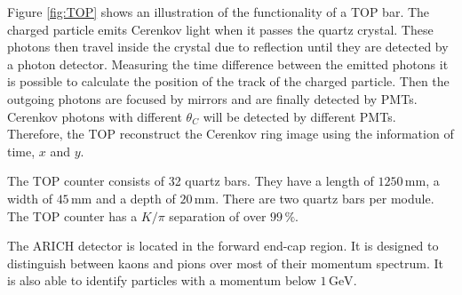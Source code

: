 \documentclass[a4paper,11pt,twosided,final,german,openbib,pdftex,listof=totoc,bibliography=totoc]{scrbook}
\begin{document}
Figure \ref{fig:TOP} shows an illustration of the functionality of a TOP bar. The charged particle emits Cerenkov light when it passes the quartz crystal. These photons then travel inside the crystal due to reflection until they are detected by a photon detector. Measuring the time difference between the emitted photons it is possible to calculate the position of the track of the charged particle. Then the outgoing photons are focused by mirrors and are finally detected by PMTs. Cerenkov photons with different $\theta_C$ will be detected by different PMTs. Therefore, the TOP reconstruct the Cerenkov ring image using the information of time, $x$ and $y$.\cite{B2TR} 

The TOP counter consists of 32 quartz bars. They have a length of $1250\,\textrm{mm}$, a width of $45\,\textrm{mm}$ and a depth of $20\,\textrm{mm}$. There are two quartz bars per module. The TOP counter has a $K/\pi$ separation of over $99\,\%$.\cite{B2TR}

The ARICH detector is located in the forward end-cap region. It is designed to distinguish between kaons and pions over most of their momentum spectrum. It is also able to identify particles with a momentum below $1\,\textrm{GeV}$.
\end{document}
